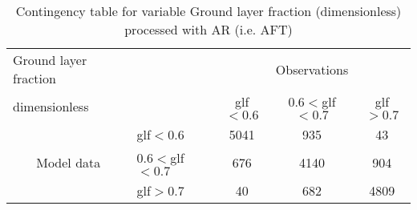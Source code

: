 
\begin{table}[]
\begin{center}
\begin{tabular}{llccc}
\hline
{Ground layer fraction}                                       &                                                    & \multicolumn{3}{c}{Observations}                 \\
{dimensionless}                                       &                             & glf$<0.6$   & $0.6<$glf$<0.7$ & glf$>0.7$ \\
\hline
\multicolumn{1}{c}{\multirow{3}{*}{Model data}}  & glf$<0.6$          & 5041                & 935                       & 43              \\
                                                 & $0.6<$glf$<0.7$ & 676                & 4140                       & 904              \\
                                                 & glf$>0.7$          & 40                & 682                       & 4809              \\
\hline
\end{tabular}
\end{center}
\caption{Contingency table for variable Ground layer fraction (dimensionless) processed with AR (i.e. AFT)}
\label{tab:contingency}
\end{table}

